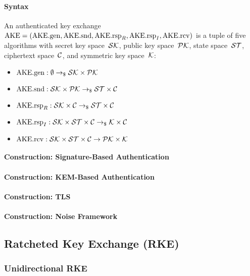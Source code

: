 \documentclass[a4paper,orivec]{llncs}
\begin{document}
\paragraph{Syntax}
An authenticated key exchange $\mathrm{AKE}=(\mathrm{AKE}.\mathrm{gen},\allowbreak\mathrm{AKE}.\mathrm{snd},\allowbreak\mathrm{AKE}.\mathrm{rsp}_R,\allowbreak\mathrm{AKE}.\mathrm{rsp}_I,\allowbreak\mathrm{AKE}.\mathrm{rcv})$ is a tuple of five algorithms with secret key space~$\mathcal{SK}$, public key space~$\mathcal{PK}$, state space~$\mathcal{ST}$, ciphertext space~$\mathcal{C}$, and symmetric key space~$\mathcal{K}$:

\begin{itemize}
    \item $\mathrm{AKE}.\mathrm{gen}: \emptyset \to_\$ \mathcal{SK}\times\mathcal{PK}$
    \item $\mathrm{AKE}.\mathrm{snd}: \mathcal{SK}\times\mathcal{PK} \to_\$ \mathcal{ST}\times\mathcal{C}$
    \item $\mathrm{AKE}.\mathrm{rsp}_R: \mathcal{SK}\times\mathcal{C} \to_\$ \mathcal{ST}\times\mathcal{C}$
    \item $\mathrm{AKE}.\mathrm{rsp}_I: \mathcal{SK}\times\mathcal{ST}\times\mathcal{C} \to_\$ \mathcal{K}\times\mathcal{C}$
    \item $\mathrm{AKE}.\mathrm{rcv}: \mathcal{SK}\times\mathcal{ST}\times\mathcal{C} \to \mathcal{PK}\times\mathcal{K}$
\end{itemize}

\paragraph{Construction: Signature-Based Authentication}

\paragraph{Construction: KEM-Based Authentication}

\paragraph{Construction: TLS}

\paragraph{Construction: Noise Framework}


\subsection{Ratcheted Key Exchange (RKE)}

\subsubsection{Unidirectional RKE}
\end{document}
